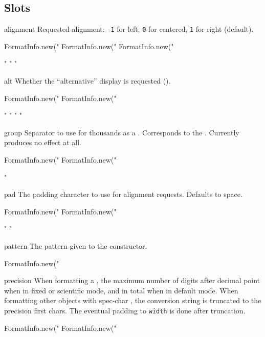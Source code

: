 \subsection{Slots}
\begin{urbiscriptapi}
\item[alignment]
  Requested alignment: \lstinline|-1| for left, \lstinline|0| for
  centered, \lstinline|1| for right (default).
\begin{urbiassert}
FormatInfo.new("%
FormatInfo.new("%
FormatInfo.new("%

 "%
"%
"%
\end{urbiassert}


\item[alt]
  Whether the ``alternative'' display is requested (\samp{\#}).
\begin{urbiassert}
FormatInfo.new("%
FormatInfo.new("%

 "%
"%
 "%
"%
\end{urbiassert}


\item[group]%
  Separator to use for thousands as a .  Corresponds to
  the  .  Currently produces no effect at all.
\begin{urbiassert}
FormatInfo.new("%
FormatInfo.new("%

"%
\end{urbiassert}


\item[pad]
  The padding character to use for alignment requests.  Defaults to space.
\begin{urbiassert}
FormatInfo.new("%
FormatInfo.new("%

 "%
"%
\end{urbiassert}


\item[pattern]
  The pattern given to the constructor.
\begin{urbiassert}
FormatInfo.new("%
\end{urbiassert}


\item[precision]
  When formatting a , the maximum number of digits
  after decimal point when in fixed or scientific mode, and in total
  when in default mode.  When formatting other objects with spec-char
  , the conversion string is truncated to the precision first
  chars. The eventual padding to \lstinline|width| is done after
  truncation.
\begin{urbiassert}
FormatInfo.new("%
FormatInfo.new("%


\end{urbiassert}
\end{urbiscriptapi}
